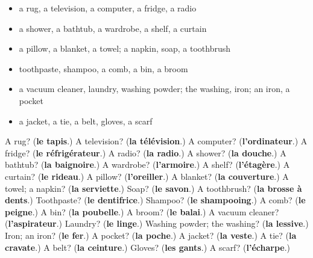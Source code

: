 \begin{itemize}
\raggedright
  \item a rug, a television, a computer, a fridge, a radio
  \item a shower, a bathtub, a wardrobe, a shelf, a curtain
  \item a pillow, a blanket, a towel; a napkin, soap, a toothbrush
  \item toothpaste, shampoo, a comb, a bin, a broom
  \item a vacuum cleaner, laundry, washing powder; the washing, iron; an iron, a pocket
  \item a jacket, a tie, a belt, gloves, a scarf
\end{itemize}

\begin{tcolorbox}[breakable,colback=teal!4,colframe=teal!35!black,title={Before you move on}]
A rug? (\textbf{le tapis}.) A television? (\textbf{la télévision}.) A computer? (\textbf{l'ordinateur}.) A fridge? (\textbf{le réfrigérateur}.) A radio? (\textbf{la radio}.) A shower? (\textbf{la douche}.) A bathtub? (\textbf{la baignoire}.) A wardrobe? (\textbf{l'armoire}.) A shelf? (\textbf{l'étagère}.) A curtain? (\textbf{le rideau}.) A pillow? (\textbf{l'oreiller}.) A blanket? (\textbf{la couverture}.) A towel; a napkin? (\textbf{la serviette}.) Soap? (\textbf{le savon}.) A toothbrush? (\textbf{la brosse à dents}.) Toothpaste? (\textbf{le dentifrice}.) Shampoo? (\textbf{le shampooing}.) A comb? (\textbf{le peigne}.) A bin? (\textbf{la poubelle}.) A broom? (\textbf{le balai}.) A vacuum cleaner? (\textbf{l'aspirateur}.) Laundry? (\textbf{le linge}.) Washing powder; the washing? (\textbf{la lessive}.) Iron; an iron? (\textbf{le fer}.) A pocket? (\textbf{la poche}.) A jacket? (\textbf{la veste}.) A tie? (\textbf{la cravate}.) A belt? (\textbf{la ceinture}.) Gloves? (\textbf{les gants}.) A scarf? (\textbf{l'écharpe}.)
\end{tcolorbox}
